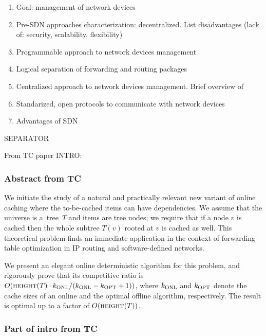 
\begin{enumerate}
  \item Goal: management of network devices
  \item Pre-SDN approaches characterization: decentralized. List disadvantages (lack of: security, scalability, flexibility)
  \item Programmable approach to network devices management
  \item Logical separation of forwarding and routing packages
  \item Centralized approach to network devices management. Brief overview of 
  \item Standarized, open protocols to communicate with network devices
  \item Advantages of SDN
\end{enumerate}


\vspace{1cm}
SEPARATOR
\vspace{1cm}

From TC paper INTRO:
\vspace{1cm}

\subsubsection{Abstract from TC}

We initiate the study of a natural and practically relevant new variant of
online caching where the to-be-cached items can have
dependencies.  We assume that the universe is a~tree~$T$ and items are tree
nodes; we require that if a node $v$ is cached then the whole subtree $T(v)$
rooted at $v$ is cached as well. This theoretical problem finds an immediate
application in the context of forwarding table optimization in IP routing and
software-defined networks.

We present an elegant online deterministic algorithm \ALG for this problem, and 
rigorously prove that its competitive ratio is 
$O(\textsc{height}(T) \cdot k_\textnormal{ONL}/(k_\textnormal{ONL}-k_\textnormal{OPT}+1))$, where $k_\textnormal{ONL}$ and $k_\textnormal{OPT}$
denote the cache sizes of an online and the optimal offline algorithm,
respectively. The result is optimal up to a factor of $O(\textsc{height}(T))$.



\subsubsection{Part of intro from TC}

